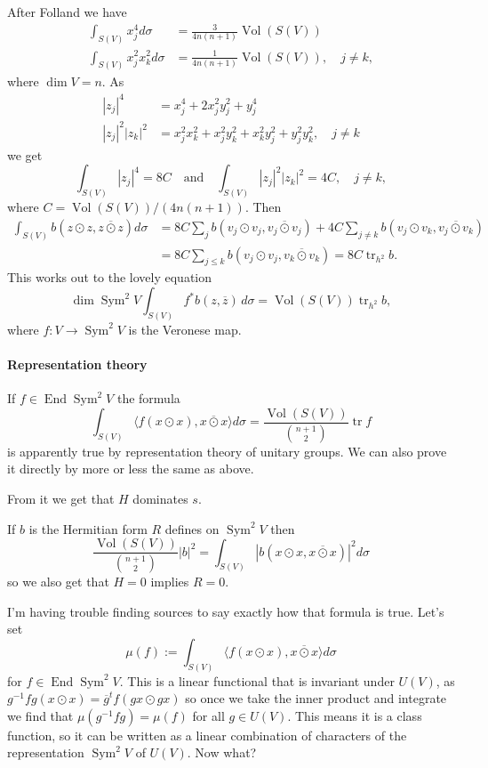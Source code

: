 \documentclass[11pt]{amsart}
\theoremstyle{definition}
\def\qandq{\quad\text{and}\quad}
\def\ov#1{\overline{#1}}
\DeclareMathOperator{\Vol}{Vol}
\DeclareMathOperator{\End}{End}
\DeclareMathOperator{\Sym}{Sym}
\DeclareMathOperator{\tr}{tr}
\begin{document}
After Folland we have
\begin{align*}
\int_{S(V)} x_j^4 d\sigma &= \frac{3}{4n(n+1)} \Vol(S(V))
\\
\int_{S(V)} x_j^2 x_k^2 d\sigma &= \frac{1}{4n(n+1)} \Vol(S(V)),
\quad j \not= k,
\end{align*}
where $\dim V = n$.
As
\begin{align*}
|z_j|^4 &= x_j^4 + 2 x_j^2 y_j^2 + y_j^4
\\
|z_j|^2 |z_k|^2 &= x_j^2 x_k^2 + x_j^2 y_k^2 + x_k^2 y_j^2 + y_j^2 y_k^2,
\quad
j \not= k
\end{align*}
we get
$$
\int_{S(V)} |z_j|^4 = 8 C
\qandq
\int_{S(V)} |z_j|^2 |z_k|^2 = 4 C,
\quad j\not=k,
$$
where $C = \Vol(S(V)) / (4n(n+1))$.
Then
\begin{align*}
\int_{S(V)}
\!\!\!
b(z \odot z, \ov{z \odot z}) d\sigma
&= 8C \sum_{j} b(v_j {\odot} v_j, \ov{v_j {\odot} v_j})
+ 4C \sum_{j\not=k} b(v_j {\odot} v_k, \ov{v_j {\odot} v_k})
\\
&= 8C \sum_{j \leq k} b(v_j {\odot} v_j, \ov{v_k {\odot} v_k})
= 8C \tr_{h^2} b.
\end{align*}
This works out to the lovely equation
$$
\dim{\Sym^2 V} \int_{S(V)} \!\! f^*b(z, \ov z) \, d\sigma
= \Vol(S(V)) \tr_{h^2} b,
$$
where $f : V \to \Sym^2 V$ is the Veronese map.


\paragraph{Representation theory}

If $f \in \End \Sym^2 V$ the formula
$$
\int_{S(V)} \langle f(x \odot x), \ov{x \odot x} \rangle d\sigma
= \frac{\Vol(S(V))}{\binom{n+1}{2}} \tr f
$$
is apparently true by representation theory of unitary groups.
We can also prove it directly by more or less the same as above.


From it we get that $H$ dominates $s$.

If $b$ is the Hermitian form $R$ defines on $\Sym^2 V$ then
$$
\frac{\Vol(S(V))}{\binom{n+1}{2}} |b|^2
= \int_{S(V)} |b(x \odot x, \ov{x \odot x})|^2 d\sigma
$$
so we also get that $H = 0$ implies $R = 0$.

I'm having trouble finding sources to say exactly how that formula is true.
Let's set
$$
\mu(f) := \int_{S(V)} \langle f(x \odot x), \ov{x \odot x} \rangle d\sigma
$$
for $f \in \End \Sym^2 V$.
This is a linear functional that is invariant under $U(V)$, as
$g^{-1} f g (x \odot x) = \ov g^t f (gx \odot gx)$
so once we take the inner product and integrate we find that $\mu(g^{-1}fg) =
\mu(f)$ for all $g \in U(V)$.
This means it is a class function, so it can be written as a linear combination
of characters of the representation $\Sym^2 V$ of $U(V)$.
Now what?
\end{document}
